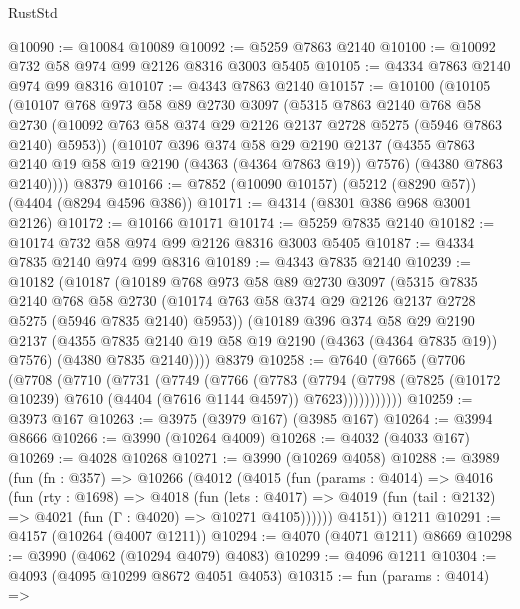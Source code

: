 \begin{lexlean}{RustStd}
\begin{coremodule}
{\begin{coremodule}
{{{{{{{{{{{{{{{{@10090 := @10084 @10089
@10092 := @5259 @7863 @2140
@10100 := @10092 @732 @58 @974 @99 @2126 @8316 @3003 @5405
@10105 := @4334 @7863 @2140 @974 @99 @8316
@10107 := @4343 @7863 @2140
@10157 := @10100
    (@10105
      (@10107
        @768
        @973
        @58
        @89
        @2730
        @3097
        (@5315
          @7863
          @2140
          @768
          @58
          @2730
          (@10092 @763 @58 @374 @29 @2126 @2137 @2728 @5275 (@5946 @7863 @2140) @5953))
        (@10107
          @396
          @374
          @58
          @29
          @2190
          @2137
          (@4355 @7863 @2140 @19 @58 @19 @2190 (@4363 (@4364 @7863 @19)) @7576)
          (@4380 @7863 @2140))))
    @8379
@10166 := @7852 (@10090 @10157) (@5212 (@8290 @57)) (@4404 (@8294 @4596 @386))
@10171 := @4314 (@8301 @386 @968 @3001 @2126)
@10172 := @10166 @10171
@10174 := @5259 @7835 @2140
@10182 := @10174 @732 @58 @974 @99 @2126 @8316 @3003 @5405
@10187 := @4334 @7835 @2140 @974 @99 @8316
@10189 := @4343 @7835 @2140
@10239 := @10182
    (@10187
      (@10189
        @768
        @973
        @58
        @89
        @2730
        @3097
        (@5315
          @7835
          @2140
          @768
          @58
          @2730
          (@10174 @763 @58 @374 @29 @2126 @2137 @2728 @5275 (@5946 @7835 @2140) @5953))
        (@10189
          @396
          @374
          @58
          @29
          @2190
          @2137
          (@4355 @7835 @2140 @19 @58 @19 @2190 (@4363 (@4364 @7835 @19)) @7576)
          (@4380 @7835 @2140))))
    @8379
@10258 := @7640
    (@7665
      (@7706
        (@7708
          (@7710
            (@7731
              (@7749
                (@7766
                  (@7783
                    (@7794
                      (@7798
                        (@7825 (@10172 @10239) @7610 (@4404 (@7616 @1144 @4597)) @7623)))))))))))
@10259 := @3973 @167
@10263 := @3975 (@3979 @167) (@3985 @167)
@10264 := @3994 @8666
@10266 := @3990 (@10264 @4009)
@10268 := @4032 (@4033 @167)
@10269 := @4028 @10268
@10271 := @3990 (@10269 @4058)
@10288 := @3989
    (fun (fn : @357) =>
    @10266
      (@4012
        (@4015
          (fun (params : @4014) =>
          @4016
            (fun (rty : @1698) =>
            @4018
              (fun (lets : @4017) =>
              @4019 (fun (tail : @2132) => @4021 (fun (Γ : @4020) => @10271 @4105))))))
        @4151))
    @1211
@10291 := @4157 (@10264 (@4007 @1211))
@10294 := @4070 (@4071 @1211) @8669
@10298 := @3990 (@4062 (@10294 @4079) @4083)
@10299 := @4096 @1211
@10304 := @4093 (@4095 @10299 @8672 @4051 @4053)
@10315 := fun (params : @4014) =>
}}}}}}}}}}}}}}}}
\end{coremodule}}
\end{coremodule}
\end{lexlean}
